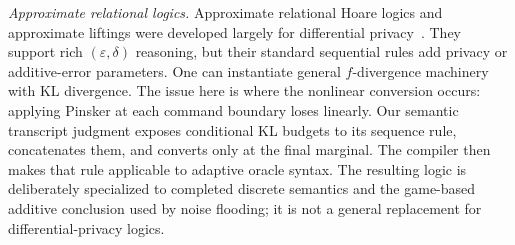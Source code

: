 \emph{Approximate relational logics.} Approximate relational Hoare logics and approximate liftings were developed largely for differential privacy~\cite{aprhl,aprhl-couplings}.
They support rich \((\varepsilon,\delta)\) reasoning, but their standard sequential rules add privacy or additive-error parameters.
One can instantiate general \(f\)-divergence machinery with KL divergence.
The issue here is where the nonlinear conversion occurs: applying Pinsker at each command boundary loses linearly.
Our semantic transcript judgment exposes conditional KL budgets to its sequence rule, concatenates them, and converts only at the final marginal.
The compiler then makes that rule applicable to adaptive oracle syntax.
The resulting logic is deliberately specialized to completed discrete semantics and the game-based additive conclusion used by noise flooding; it is not a general replacement for differential-privacy logics.
